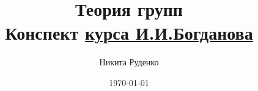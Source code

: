 

\author{Никита Руденко}
\title{%
  Теория групп \\
  \vspace{2ex}
  \large Конспект %
    \href{https://www.youtube.com/playlist?list=PLyBWNG-pZKx6pWlAfPRo2X_kPWyzq1ebj}%
    {курса И.\:И.\:Богданова}}
\date{\today}



\maketitle






